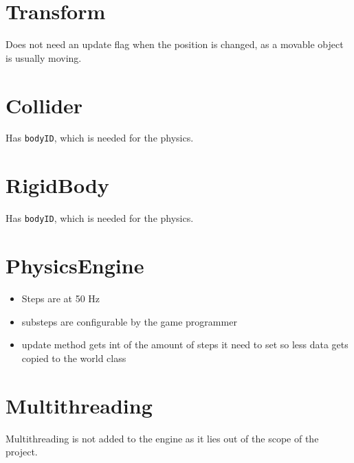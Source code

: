 \documentclass{article}
\begin{document}
\section{Transform}
Does not need an update flag when the position is changed, as a movable object is usually moving.

\section{Collider}
Has \texttt{bodyID}, which is needed for the physics.

\section{RigidBody}
Has \texttt{bodyID}, which is needed for the physics.

\section{PhysicsEngine}{
  \begin{itemize}
    \item Steps are at 50 Hz
    \item substeps are configurable by the game programmer
    \item update method gets int of the amount of steps it need to set so less data gets copied to the world class
  \end{itemize}
}

\section{Multithreading}
Multithreading is not added to the engine as it lies out of the scope of the project.
\end{document}
